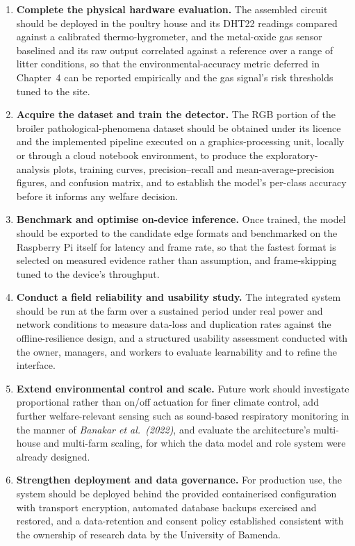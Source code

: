 \documentclass[12pt,a4paper]{report}
\begin{document}
\begin{enumerate}[label=\arabic*., leftmargin=1.5cm]
\item \textbf{Complete the physical hardware evaluation.} The assembled circuit should be deployed in the poultry house and its DHT22 readings compared against a calibrated thermo-hygrometer, and the metal-oxide gas sensor baselined and its raw output correlated against a reference over a range of litter conditions, so that the environmental-accuracy metric deferred in Chapter~4 can be reported empirically and the gas signal's risk thresholds tuned to the site.
\item \textbf{Acquire the dataset and train the detector.} The RGB portion of the broiler pathological-phenomena dataset should be obtained under its licence and the implemented pipeline executed on a graphics-processing unit, locally or through a cloud notebook environment, to produce the exploratory-analysis plots, training curves, precision--recall and mean-average-precision figures, and confusion matrix, and to establish the model's per-class accuracy before it informs any welfare decision.
\item \textbf{Benchmark and optimise on-device inference.} Once trained, the model should be exported to the candidate edge formats and benchmarked on the Raspberry Pi itself for latency and frame rate, so that the fastest format is selected on measured evidence rather than assumption, and frame-skipping tuned to the device's throughput.
\item \textbf{Conduct a field reliability and usability study.} The integrated system should be run at the farm over a sustained period under real power and network conditions to measure data-loss and duplication rates against the offline-resilience design, and a structured usability assessment conducted with the owner, managers, and workers to evaluate learnability and to refine the interface.
\item \textbf{Extend environmental control and scale.} Future work should investigate proportional rather than on/off actuation for finer climate control, add further welfare-relevant sensing such as sound-based respiratory monitoring in the manner of \textit{Banakar et al.\ (2022)}, and evaluate the architecture's multi-house and multi-farm scaling, for which the data model and role system were already designed.
\item \textbf{Strengthen deployment and data governance.} For production use, the system should be deployed behind the provided containerised configuration with transport encryption, automated database backups exercised and restored, and a data-retention and consent policy established consistent with the ownership of research data by the University of Bamenda.
\end{enumerate}
\end{document}
